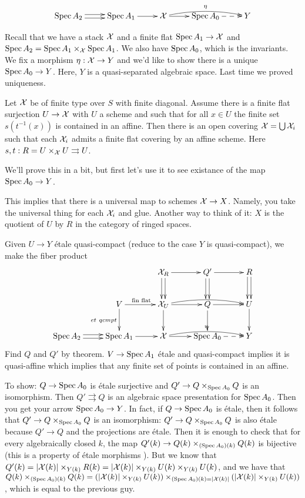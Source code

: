 

\[\xymatrix{
  \spec A_2\ar@<.5ex>[r]\ar@<-.5ex>[r] & \spec A_1\ar[r]& \X\ar[r]
\ar@/^/[rr]^\eta & \spec A_0 \ar@{-->}[r] & Y
}\]

Recall that we have a stack $\mathcal{X}$ and a finite flat $\operatorname{Spec} A_1\to \mathcal{X}$
and $\operatorname{Spec} A_2=\operatorname{Spec} A_1\times_{\mathcal{X}} \operatorname{Spec} A_1$. We also have $\operatorname{Spec}
A_0$, which is the invariants. We fix a morphism $\eta:\mathcal{X}\to Y$ and
we'd like to show there is a unique $\operatorname{Spec} A_0\to Y$. Here, $Y$ is a
quasi-separated algebraic space. Last time we proved uniqueness.
\begin{theorem}
  Let $\mathcal{X}$ be of finite type over $S$ with finite diagonal. Assume
there is a finite flat surjection $U\to \mathcal{X}$ with $U$ a scheme and
such that for all $x\in U$ the finite set $s(t^{-1}(x))$ is contained
in an affine. Then there is an open covering $\mathcal{X}=\bigcup \mathcal{X}_i$ such
that each $\mathcal{X}_i$ admits a finite flat covering by an affine scheme.
Here $s,t:R=U\times_{\mathcal{X}} U\rightrightarrows U$.
\end{theorem}
We'll prove this in a bit, but first let's use it to see existance of
the map $\operatorname{Spec} A_0\to Y$.
\begin{remark}
  This implies that there is a universal map to schemes $\mathcal{X}\to X$.
Namely, you take the universal thing for each $\mathcal{X}_i$ and glue.
Another way to think of it: $X$ is the quotient of $U$ by $R$ in the
category of ringed spaces.
\end{remark}
Given $U\to Y$ \'etale quasi-compact (reduce to the case $Y$ is
quasi-compact), we make the fiber product
\[\xymatrix{
  & & \X_R \ar@<.5ex>[d]\ar@<-.5ex>[d]\ar[r] &
Q'\ar@<.5ex>[d]\ar@<-.5ex>[d]\ar[r] & R\ar@<.5ex>[d]\ar@<-.5ex>[d]\\
  & V\ar[d]_{et\ qcmpt}\ar[r]^{\text{fin\ flat}} &
\X_U\ar[d]\ar@/^/[rr] \ar[r] & Q\ar[d]\ar[r] & U\ar[d]\\
  \spec A_2\ar@<.5ex>[r]\ar@<-.5ex>[r] & \spec A_1\ar[r]& \X\ar[r]
\ar@/^/[rr]^\eta & \spec A_0 \ar@{-->}[r] & Y
}\]
Find $Q$ and $Q'$ by theorem. $V\to \operatorname{Spec} A_1$ \'etale and
quasi-compact implies it is quasi-affine which implies that any
finite set of points is contained in an affine.

To show: $Q\to \operatorname{Spec} A_0$ is \'etale surjective and $Q'\to
Q\times_{\operatorname{Spec} A_0}Q$ is an isomorphism. Then $Q'\rightrightarrows Q$
is an algebraic space presentation for $\operatorname{Spec} A_0$. Then you get your
arrow $\operatorname{Spec} A_0\to Y$. In fact, if $Q\to \operatorname{Spec} A_0$ is \'etale, then
it follows that $Q'\to Q\times_{\operatorname{Spec} A_0}Q$ is an isomorphism:
$Q'\to Q\times_{\operatorname{Spec} A_0}Q$ is also \'etale because $Q'\to Q$ and
the projections are \'etale. Then it is enough to check that for
every algebraically closed $k$, the map $Q'(k)\to Q(k)\times_{(\operatorname{Spec}
A_0)(k)}Q(k)$ is bijective (this is a property of \'etale morphisms
\cite[I.5.7]{SGA}). But we know that $Q'(k)=|\mathcal{X}(k)|\times_{Y(k)}R(k)
= |\mathcal{X}(k)|\times_{Y(k)}U(k)\times_{Y(k)}U(k)$, and we have that
$Q(k)\times_{(\operatorname{Spec} A_0)(k)}Q(k) =
(|\mathcal{X}(k)|\times_{Y(k)}U(k))\times_{(\operatorname{Spec}
A_0)(k)=|\mathcal{X}(k)|}(|\mathcal{X}(k)|\times_{Y(k)}U(k))$, which is equal to the
previous guy.


